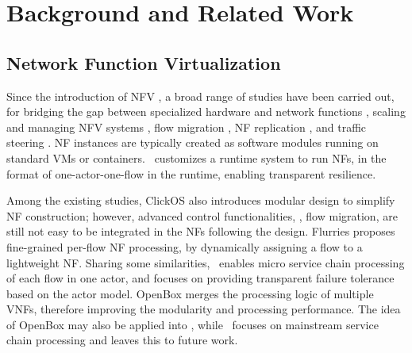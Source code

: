 \section{Background and Related Work}
\label{sec:relatedwork}



\subsection{Network Function Virtualization}

Since the introduction of NFV \cite{nfv_whitepaper}, %
 a broad range of studies have been carried out, for bridging the gap between specialized hardware and network functions \cite{hwang2015netvm, Han:EECS-2015-155, martins2014clickos, 199352}, scaling and managing NFV systems \cite{gember2012stratos, palkar2015e2}, flow migration \cite{rajagopalan2013split, khalid2016paving, gember2015opennf}, NF replication \cite{rajagopalan2013pico, sherry2015rollback}, and traffic steering \cite{simplifying}. %
NF instances are typically created as software modules running on standard VMs or containers. \nfactor~customizes a runtime system to run NFs, in the format of one-actor-one-flow in the runtime, enabling transparent resilience. %



Among the existing studies, ClickOS  \cite{martins2014clickos} %
also introduces modular design to simplify NF construction; however, advanced control functionalities, \eg, flow migration, are still not easy to be integrated in the NFs following the design.
Flurries \cite{zhang2016flurries} proposes fine-grained per-flow NF processing, by dynamically assigning a flow to a lightweight NF. Sharing some similarities, \nfactor~enables micro service chain processing of each flow in one actor, and focuses on providing transparent failure tolerance based on the actor model. OpenBox \cite{OpenBox} merges the processing logic of multiple VNFs, therefore improving the modularity and processing performance. The idea of OpenBox may also be applied into \nfactor, while \nfactor~focuses on mainstream service chain processing and leaves this to future work.

